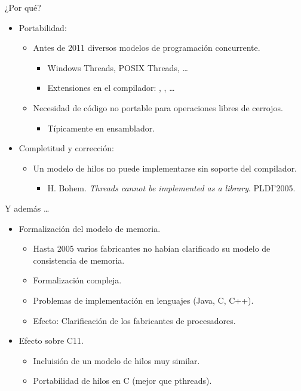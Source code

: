 \begin{frame}[t]{¿Por qué?}
\begin{itemize}
  \item Portabilidad:
    \begin{itemize}
      \pause
      \item Antes de 2011 diversos modelos de programación concurrente.
        \begin{itemize}
          \item Windows Threads, POSIX Threads, \ldots
          \item Extensiones en el compilador: ,
, \ldots
        \end{itemize}
      \pause
      \item Necesidad de código no portable para operaciones libres de cerrojos.
        \begin{itemize}
          \item Típicamente en ensamblador.
        \end{itemize}
    \end{itemize}
  \pause
  \item Completitud y corrección:
    \begin{itemize}
      \item Un modelo de hilos no puede implementarse sin soporte del
compilador.
        \begin{itemize}
          \item H. Bohem. \emph{Threads cannot be implemented as a library}.
PLDI'2005.
        \end{itemize}
    \end{itemize}
\end{itemize}
\end{frame}

\begin{frame}[t]{Y además \ldots}
\begin{itemize}
  \item Formalización del modelo de memoria.
    \begin{itemize}
      \item Hasta 2005 varios fabricantes no habían clarificado su modelo
            de consistencia de memoria.
      \item Formalización compleja.
      \item Problemas de implementación en lenguajes (Java, C, C++).
      \item Efecto: Clarificación de los fabricantes de procesadores.
    \end{itemize}
  \pause
  \vspace{12pt}
  \item Efecto sobre C11.
    \begin{itemize}
      \item Incluisión de un modelo de hilos muy similar.
      \item Portabilidad de hilos en C (mejor que pthreads).
    \end{itemize}
\end{itemize}
\end{frame}

